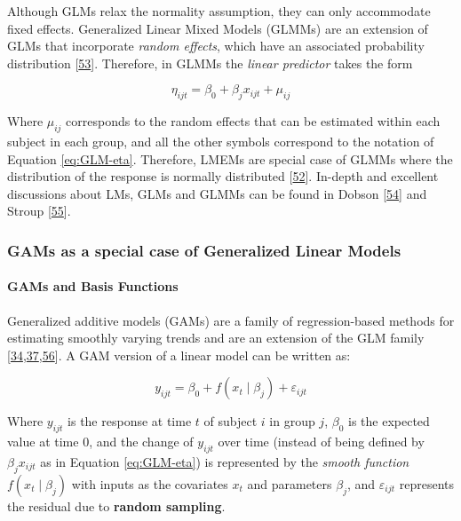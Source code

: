 \documentclass[
]{article}
\begin{document}
Although GLMs relax the normality assumption, they can only accommodate fixed effects. Generalized Linear Mixed Models (GLMMs) are an extension of GLMs that incorporate \emph{random effects}, which have an associated probability distribution {[}\protect\hyperlink{ref-mcculloch2001}{53}{]}. Therefore, in GLMMs the \emph{linear predictor} takes the form

\begin{equation}
\eta_{ijt}=\beta_0+\beta_{j}x_{ijt}+\mu_{ij}
\label{eq:GLMM-eta}
\end{equation}

Where \(\mu_{ij}\) corresponds to the random effects that can be estimated within each subject in each group, and all the other symbols correspond to the notation of Equation \eqref{eq:GLM-eta}. Therefore, LMEMs are special case of GLMMs where the distribution of the response is normally distributed {[}\protect\hyperlink{ref-nelder1972}{52}{]}. In-depth and excellent discussions about LMs, GLMs and GLMMs can be found in Dobson {[}\protect\hyperlink{ref-dobson2008}{54}{]} and Stroup {[}\protect\hyperlink{ref-stroup2013}{55}{]}.

\hypertarget{GAM-theory}{%
\subsubsection{GAMs as a special case of Generalized Linear Models}\label{GAM-theory}}

\hypertarget{gams-and-basis-functions}{%
\paragraph{GAMs and Basis Functions}\label{gams-and-basis-functions}}

Generalized additive models (GAMs) are a family of regression-based methods for estimating smoothly varying trends and are an extension of the GLM family {[}\protect\hyperlink{ref-simpson2018}{34},\protect\hyperlink{ref-wood2017}{37},\protect\hyperlink{ref-hastie1987}{56}{]}. A GAM version of a linear model can be written as:

\begin{equation}
  y_{ijt}=\beta_0+f(x_t\mid \beta_j)+\varepsilon_{ijt}
  \label{eq:GAM}
\end{equation}

Where \(y_{ijt}\) is the response at time \(t\) of subject \(i\) in group \(j\), \(\beta_0\) is the expected value at time 0, and the change of \(y_{ijt}\) over time (instead of being defined by \(\beta_{j}x_{ijt}\) as in Equation \eqref{eq:GLM-eta}) is represented by the \emph{smooth function} \(f(x_t\mid \beta_j)\) with inputs as the covariates \(x_t\) and parameters \(\beta_j\), and \(\varepsilon_{ijt}\) represents the residual due to \textbf{random sampling}.
\end{document}
